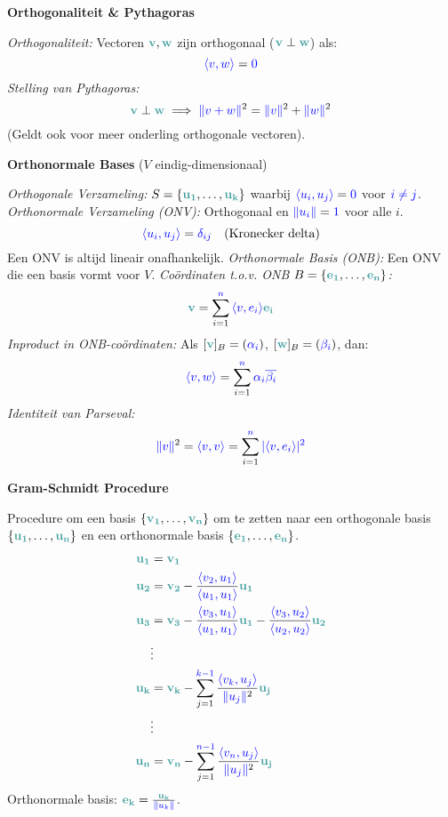 \documentclass[12pt]{article}
\renewcommand{\vec}[1]{\textcolor{vectorTeal}{\mathbf{#1}}}
\newcommand{\scalar}[1]{\textcolor{scalarBrightBlue}{#1}}
\newcommand{\innerprod}[2]{\scalar{\langle #1, #2 \rangle}}
\newcommand{\norm}[1]{\scalar{\| #1 \|}}
\begin{document}
\vspace{1.5em} %
{\centering
\textcolor{headerBrown}{\large\textbf{Orthogonaliteit & Pythagoras}}
\par
}%
\textit{Orthogonaliteit:} Vectoren $\vec{v}, \vec{w}$ zijn orthogonaal ($\vec{v} \perp \vec{w}$) als:
\[
\innerprod{v}{w} = \scalar{0}
\]
\textit{Stelling van Pythagoras:}
\[
\vec{v} \perp \vec{w} \implies \norm{v + w}^2 = \norm{v}^2 + \norm{w}^2
\]
(Geldt ook voor meer onderling orthogonale vectoren).

\vspace{1.5em} %
{\centering
\textcolor{headerBrown}{\large\textbf{Orthonormale Bases}} ($V$ eindig-dimensionaal)
\par
}%
\textit{Orthogonale Verzameling:} $S = \{\vec{u_1}, \dots, \vec{u_k}\}$ waarbij $\innerprod{u_i}{u_j} = \scalar{0}$ voor $\scalar{i \neq j}$.
\textit{Orthonormale Verzameling (ONV):} Orthogonaal en $\norm{u_i} = \scalar{1}$ voor alle $i$.
\[
\innerprod{u_i}{u_j} = \scalar{\delta_{ij}} \quad (\text{Kronecker delta})
\]
Een ONV is altijd lineair onafhankelijk.
\textit{Orthonormale Basis (ONB):} Een ONV die een basis vormt voor $V$.
\textit{Coördinaten t.o.v. ONB $B = \{\vec{e_1}, \dots, \vec{e_n}\}$:}
\[
\vec{v} = \sum_{i=1}^{\scalar{n}} \innerprod{v}{e_i} \vec{e_i}
\]
\textit{Inproduct in ONB-coördinaten:} Als $[\vec{v}]_B = (\scalar{\alpha_i})$, $[\vec{w}]_B = (\scalar{\beta_i})$, dan:
\[
\innerprod{v}{w} = \sum_{i=1}^{\scalar{n}} \scalar{\alpha_i \overline{\beta_i}}
\]
\textit{Identiteit van Parseval:}
\[
\norm{v}^2 = \innerprod{v}{v} = \sum_{i=1}^{\scalar{n}} \scalar{|\innerprod{v}{e_i}|^2}
\]

\vspace{1.5em} %
{\centering
\textcolor{headerBrown}{\large\textbf{Gram-Schmidt Procedure}}
\par
}%
Procedure om een basis $\{\vec{v_1}, \dots, \vec{v_n}\}$ om te zetten naar een orthogonale basis $\{\vec{u_1}, \dots, \vec{u_n}\}$ en een orthonormale basis $\{\vec{e_1}, \dots, \vec{e_n}\}$.
\begin{align*}
\vec{u_1} &= \vec{v_1} \\
\vec{u_2} &= \vec{v_2} - \frac{\innerprod{v_2}{u_1}}{\innerprod{u_1}{u_1}} \vec{u_1} \\
\vec{u_3} &= \vec{v_3} - \frac{\innerprod{v_3}{u_1}}{\innerprod{u_1}{u_1}} \vec{u_1} - \frac{\innerprod{v_3}{u_2}}{\innerprod{u_2}{u_2}} \vec{u_2} \\
&\vdots \\
\vec{u_k} &= \vec{v_k} - \sum_{j=1}^{\scalar{k-1}} \frac{\innerprod{v_k}{u_j}}{\norm{u_j}^2} \vec{u_j} \\
&\vdots \\
\vec{u_n} &= \vec{v_n} - \sum_{j=1}^{\scalar{n-1}} \frac{\innerprod{v_n}{u_j}}{\norm{u_j}^2} \vec{u_j}
\end{align*}
Orthonormale basis: $\vec{e_k} = \frac{\vec{u_k}}{\norm{u_k}}$.
\end{document}
